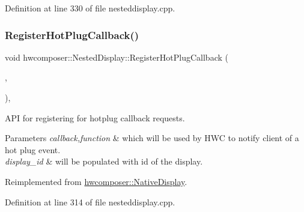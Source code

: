 Definition at line 330 of file nesteddisplay.\+cpp.


\begin{DoxyCode}{0}
\end{DoxyCode}
\mbox{\label{classhwcomposer_1_1NestedDisplay_a0e9948e4763ef5abcdfcd12e42ef7267}} 
\subsubsection{\texorpdfstring{Register\+Hot\+Plug\+Callback()}{RegisterHotPlugCallback()}}
{\footnotesize\ttfamily void hwcomposer\+::\+Nested\+Display\+::\+Register\+Hot\+Plug\+Callback (\begin{DoxyParamCaption}\item[{std\+::shared\+\_\+ptr$<$ \mbox{\hyperlink{classhwcomposer_1_1HotPlugCallback}{Hot\+Plug\+Callback}} $>$}]{,  }\item[{uint32\+\_\+t}]{ }\end{DoxyParamCaption})\hspace{0.3cm}{\ttfamily [override]}, {\ttfamily [virtual]}}

A\+PI for registering for hotplug callback requests. 
\begin{DoxyParams}{Parameters}
{\em callback,function} & which will be used by H\+WC to notify client of a hot plug event. \\
\hline
{\em display\+\_\+id} & will be populated with id of the display. \\
\hline
\end{DoxyParams}


Reimplemented from \mbox{\hyperlink{classhwcomposer_1_1NativeDisplay_a4080879c203571d6404ba3b3aff53631}{hwcomposer\+::\+Native\+Display}}.



Definition at line 314 of file nesteddisplay.\+cpp.


\begin{DoxyCode}{0}
\end{DoxyCode}
\mbox{\label{classhwcomposer_1_1NestedDisplay_a821c1f2bf3622c4889e8c84f2a6935d3}} 
